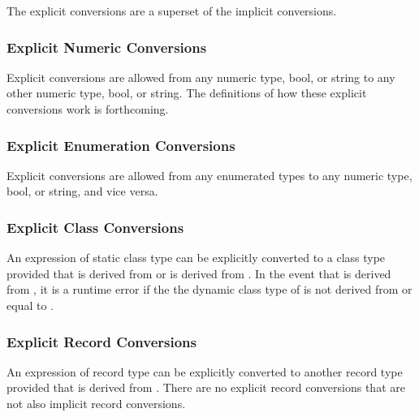 The explicit conversions are a superset of the implicit conversions.

\subsubsection{Explicit Numeric Conversions}
\label{Explicit_Numeric_Conversions}

Explicit conversions are allowed from any numeric type, bool, or
string to any other numeric type, bool, or string.  The definitions of
how these explicit conversions work is forthcoming.

\subsubsection{Explicit Enumeration Conversions}
\label{Explicit_Enumeration_Conversions}

Explicit conversions are allowed from any enumerated types to any
numeric type, bool, or string, and vice versa.

\subsubsection{Explicit Class Conversions}
\label{Explicit_Class_Conversions}

An expression of static class type  can be explicitly
converted to a class type  provided that  is derived
from  or  is derived from .  In the event
that  is derived from , it is a runtime error if the
the dynamic class type of  is not derived from or equal
to .

\subsubsection{Explicit Record Conversions}
\label{Explicit_Record_Conversions}

An expression of record type  can be explicitly converted to
another record type  provided that  is derived
from .  There are no explicit record conversions that are not
also implicit record conversions.
